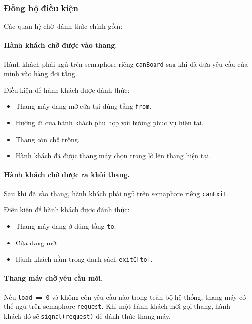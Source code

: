 \subsubsection*{Đồng bộ điều kiện}

Các quan hệ chờ--đánh thức chính gồm:

\paragraph{Hành khách chờ được vào thang.}

Hành khách phải ngủ trên semaphore riêng \texttt{canBoard} sau khi đã đưa
yêu cầu của mình vào hàng đợi tầng.

Điều kiện để hành khách được đánh thức:

\begin{itemize}
    \item Thang máy đang mở cửa tại đúng tầng \texttt{from}.
    \item Hướng đi của hành khách phù hợp với hướng phục vụ hiện tại.
    \item Thang còn chỗ trống.
    \item Hành khách đã được thang máy chọn trong lô lên thang hiện tại.
\end{itemize}

\paragraph{Hành khách chờ được ra khỏi thang.}

Sau khi đã vào thang, hành khách phải ngủ trên semaphore riêng
\texttt{canExit}.

Điều kiện để hành khách được đánh thức:

\begin{itemize}
    \item Thang máy đang ở đúng tầng \texttt{to}.
    \item Cửa đang mở.
    \item Hành khách nằm trong danh sách \texttt{exitQ[to]}.
\end{itemize}

\paragraph{Thang máy chờ yêu cầu mới.}

Nếu \texttt{load == 0} và không còn yêu cầu nào trong toàn bộ hệ thống,
thang máy có thể ngủ trên semaphore \texttt{request}. Khi một hành khách
mới gọi thang, hành khách đó sẽ \texttt{signal(request)} để đánh thức
thang máy.

